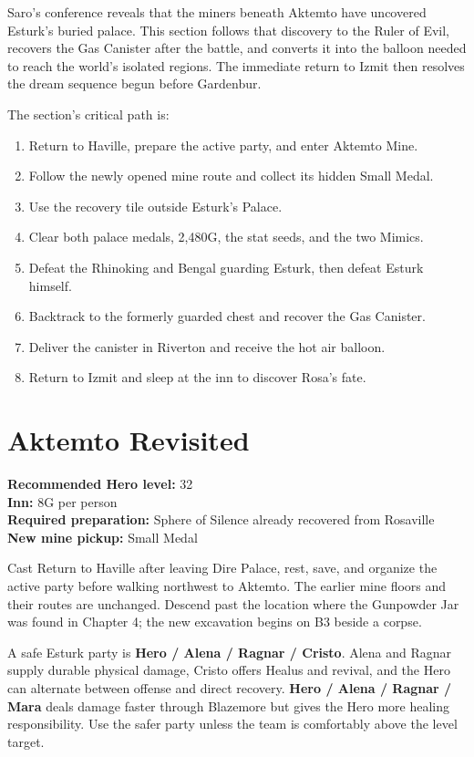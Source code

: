 \documentclass[
  american,
  10pt,
  letterpaper,
  oneside,
  open=any]{scrreprt}
\providecommand{\tightlist}{%
  \setlength{\itemsep}{0pt}\setlength{\parskip}{0pt}}
\begin{document}
Saro's conference reveals that the miners beneath Aktemto have uncovered
Esturk's buried palace. This section follows that discovery to the Ruler
of Evil, recovers the Gas Canister after the battle, and converts it
into the balloon needed to reach the world's isolated regions. The
immediate return to Izmit then resolves the dream sequence begun before
Gardenbur.

The section's critical path is:

\begin{enumerate}
\def\labelenumi{\arabic{enumi}.}
\tightlist
\item
  Return to Haville, prepare the active party, and enter Aktemto Mine.
\item
  Follow the newly opened mine route and collect its hidden Small Medal.
\item
  Use the recovery tile outside Esturk's Palace.
\item
  Clear both palace medals, 2,480G, the stat seeds, and the two Mimics.
\item
  Defeat the Rhinoking and Bengal guarding Esturk, then defeat Esturk
  himself.
\item
  Backtrack to the formerly guarded chest and recover the Gas Canister.
\item
  Deliver the canister in Riverton and receive the hot air balloon.
\item
  Return to Izmit and sleep at the inn to discover Rosa's fate.
\end{enumerate}

\section{Aktemto Revisited}\label{aktemto-revisited}

\textbf{Recommended Hero level:} 32\\
\textbf{Inn:} 8G per person\\
\textbf{Required preparation:} Sphere of Silence already recovered from
Rosaville\\
\textbf{New mine pickup:} Small Medal

Cast Return to Haville after leaving Dire Palace, rest, save, and
organize the active party before walking northwest to Aktemto. The
earlier mine floors and their routes are unchanged. Descend past the
location where the Gunpowder Jar was found in Chapter 4; the new
excavation begins on B3 beside a corpse.

A safe Esturk party is \textbf{Hero / Alena / Ragnar / Cristo}. Alena
and Ragnar supply durable physical damage, Cristo offers Healus and
revival, and the Hero can alternate between offense and direct recovery.
\textbf{Hero / Alena / Ragnar / Mara} deals damage faster through
Blazemore but gives the Hero more healing responsibility. Use the safer
party unless the team is comfortably above the level target.
\end{document}
